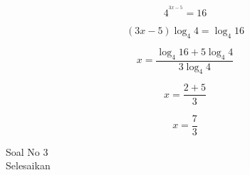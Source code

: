 \begin{eulernotebook}
\begin{eulercomment}
\begin{eulercomment}
\begin{eulercomment}
\end{eulercomment}
\begin{eulerformula}
\[
4^{^{3x-5}} = 16
\]
\end{eulerformula}
\begin{eulerformula}
\[
(3x-5)\log_{4}4 = \log_{4}16
\]
\end{eulerformula}
\begin{eulerformula}
\[
x = \frac{\log_{4}16 + 5\log_{4}4}{3\log_{4}4}
\]
\end{eulerformula}
\begin{eulerformula}
\[
x = \frac{2 + 5}{3}
\]
\end{eulerformula}
\begin{eulerformula}
\[
x = \frac{7}{3}
\]
\end{eulerformula}
\begin{eulercomment}
\end{eulercomment}
\eulersubheading{}
\begin{eulercomment}
Soal No 3\\
Selesaikan


\end{eulercomment}
\end{eulercomment}
\end{eulercomment}
\end{eulernotebook}
